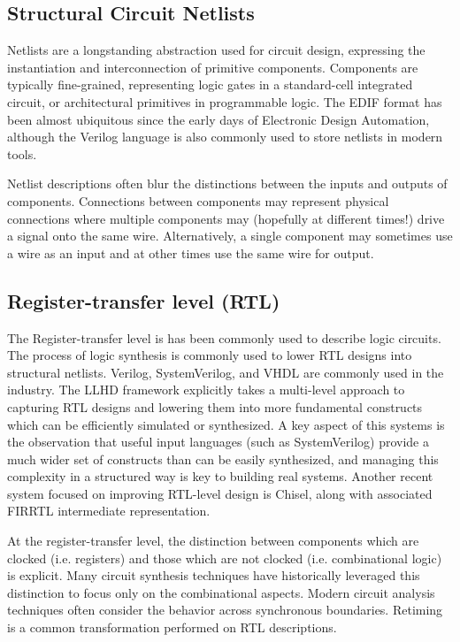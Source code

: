 \documentclass{tufte-handout}
\begin{document}
\subsection{Structural Circuit Netlists}\label{sec:netlists}
Netlists are a longstanding abstraction used for circuit design, expressing the instantiation and interconnection of primitive components.   Components are typically fine-grained, representing logic gates in a standard-cell integrated circuit, or architectural primitives in programmable logic.  The EDIF\cite{EDIF} format has been almost ubiquitous since the early days of Electronic Design Automation, although the Verilog\cite{verilog} language is also commonly used to store netlists in modern tools.  

Netlist descriptions often blur the distinctions between the inputs and outputs of components.  Connections between components may represent physical connections where multiple components may (hopefully at different times!) drive a signal onto the same wire.  Alternatively, a single component may sometimes use a wire as an input and at other times use the same wire for output.

\subsection{Register-transfer level (RTL)}\label{sec:rtl}
The Register-transfer level is has been commonly used to describe logic circuits.  The process of logic synthesis is commonly used to lower RTL designs into structural netlists.  Verilog, SystemVerilog, and VHDL are commonly used in the industry.  The LLHD framework\cite{schuiki2020llhd} explicitly takes a multi-level approach to capturing RTL designs and lowering them into more fundamental constructs which can be efficiently simulated or synthesized.  A key aspect of this systems is the observation that useful input languages (such as SystemVerilog) provide a much wider set of constructs than can be easily synthesized, and managing this complexity in a structured way is key to building real systems.  Another recent system focused on improving RTL-level design is Chisel\cite{bachrach12chisel}, along with associated FIRRTL\cite{berkeley17firrtl}\cite{berkeley16firrtl} intermediate representation.

At the register-transfer level, the distinction between components which are clocked (i.e. registers) and those which are not clocked (i.e. combinational logic) is explicit.  Many circuit synthesis techniques have historically leveraged this distinction to focus only on the combinational aspects.  Modern circuit analysis techniques often consider the behavior across synchronous boundaries.  Retiming is a common transformation performed on RTL descriptions.
\end{document}
